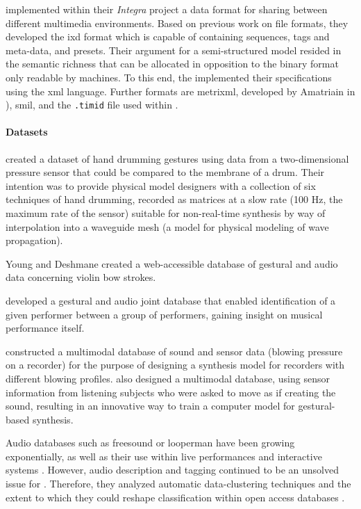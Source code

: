 {	\citeauthor{icmc/bbp2372.2009.012} \parencite{icmc/bbp2372.2009.012} implemented within their \textit{Integra} project a data format for sharing between different multimedia environments. Based on previous work on file formats, they developed the \gls{ixd} format which is capable of containing sequences, tags and meta-data, and presets. Their argument for a semi-structured model resided in the semantic richness that can be allocated in opposition to the binary format only readable by machines. To this end, the implemented their specifications using the \gls{xml} language. Further formats are \gls{metrixml}, developed by Amatriain in \parencite{Amatriain/2004/phdthesis}), \gls{smil}, and the \texttt{.timid} file used within .


	\paragraph{Datasets}

	\citeauthor{DBLP:conf/icmc/JonesLS07} \parencite{DBLP:conf/icmc/JonesLS07} created a dataset of hand drumming gestures using data from a two-dimensional pressure sensor that could be compared to the membrane of a drum. Their intention was to provide physical model designers with a collection of six techniques of hand drumming, recorded as matrices at a slow rate (100 Hz, the maximum rate of the sensor) suitable for non-real-time synthesis by way of interpolation into a waveguide mesh (a model for physical modeling of wave propagation).

	Young and Deshmane \parencite{Young2007} created a web-accessible database of gestural and audio data concerning violin bow strokes. 

	\citeauthor{Hochenbaum2010} \parencite{Hochenbaum2010} developed a gestural and audio joint database that enabled identification of a given performer between a group of performers, gaining insight on musical performance itself.

	\citeauthor{Garcia2011} \parencite{Garcia2011} constructed a multimodal database of sound and sensor data (blowing pressure on a recorder) for the purpose of designing a synthesis model for recorders with different blowing profiles. \citeauthor{fvisi:2017} \parencite{fvisi:2017} also designed a multimodal database, using sensor information from listening subjects who were asked to move as if creating the sound, resulting in an innovative way to train a computer model for gestural-based synthesis.

	Audio databases such as \gls{freesound} or \gls{looperman} have been growing exponentially, as well as their use within live performances and interactive systems \parencite{nuno_n_correia_2010_849729}. However, audio description and tagging continued to be an unsolved issue for \citeauthor{gerard_roma_2012_850102}. Therefore, they analyzed automatic data-clustering techniques and the extent to which they could reshape classification within open access databases \parencite{gerard_roma_2012_850102}.


}
